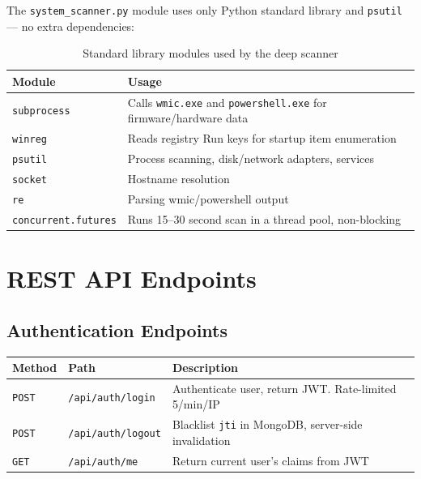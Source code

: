 \documentclass[12pt,a4paper]{article}
\begin{document}
The \texttt{system\_scanner.py} module uses only Python standard library and
\texttt{psutil} — no extra dependencies:

\begin{table}[H]
\centering
\begin{tabularx}{\linewidth}{lX}
\toprule
\textbf{Module} & \textbf{Usage} \\
\midrule
\texttt{subprocess} & Calls \texttt{wmic.exe} and \texttt{powershell.exe} for firmware/hardware data \\
\texttt{winreg} & Reads registry Run keys for startup item enumeration \\
\texttt{psutil} & Process scanning, disk/network adapters, services \\
\texttt{socket} & Hostname resolution \\
\texttt{re} & Parsing wmic/powershell output \\
\texttt{concurrent.futures} & Runs 15–30 second scan in a thread pool, non-blocking \\
\bottomrule
\end{tabularx}
\caption{Standard library modules used by the deep scanner}
\end{table}

\section{REST API Endpoints}

\subsection{Authentication Endpoints}

\begin{table}[H]
\centering
\begin{tabularx}{\linewidth}{llX}
\toprule
\textbf{Method} & \textbf{Path} & \textbf{Description} \\
\midrule
\texttt{POST} & \texttt{/api/auth/login} & Authenticate user, return JWT. Rate-limited 5/min/IP \\
\texttt{POST} & \texttt{/api/auth/logout} & Blacklist \texttt{jti} in MongoDB, server-side invalidation \\
\texttt{GET}  & \texttt{/api/auth/me}    & Return current user's claims from JWT \\
\bottomrule
\end{tabularx}
\end{table}
\end{document}
